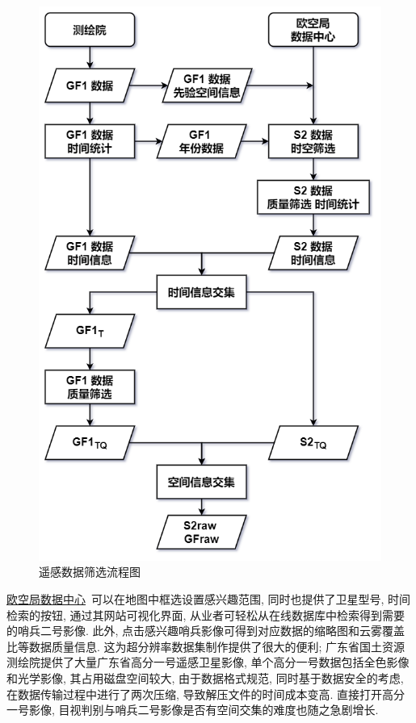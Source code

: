 \begin{figure}[!htbp]
    \centering
    \includegraphics[height=0.60\textheight]{pic/chap02-02.png}
    \caption{遥感数据筛选流程图}
    \label{fig:0202}
\end{figure}

\href{https://scihub.copernicus.eu/dhus/#/home}{欧空局数据中心}~可以在地图中框选设置感兴趣范围, 同时也提供了卫星型号, 时间检索的按钮, 通过其网站可视化界面, 从业者可轻松从在线数据库中检索得到需要的哨兵二号影像. 此外, 点击感兴趣哨兵影像可得到对应数据的缩略图和云雾覆盖比等数据质量信息. 这为超分辨率数据集制作提供了很大的便利; 广东省国土资源测绘院提供了大量广东省高分一号遥感卫星影像, 单个高分一号数据包括全色影像和光学影像, 其占用磁盘空间较大, 由于数据格式规范, 同时基于数据安全的考虑, 在数据传输过程中进行了两次压缩, 导致解压文件的时间成本变高. 直接打开高分一号影像, 目视判别与哨兵二号影像是否有空间交集的难度也随之急剧增长. 

